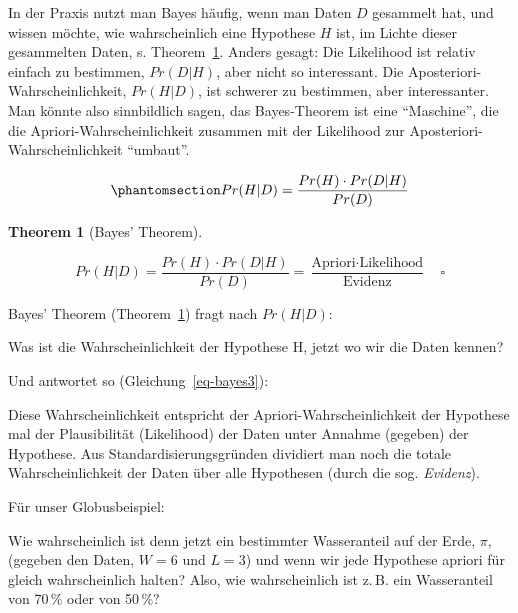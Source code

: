 \documentclass[
  ngerman,
  letterpaper,
  twoside,
  open=any]{scrbook}
\theoremstyle{definition}
\theoremstyle{plain}
\newtheorem{theorem}{Theorem}[chapter]
\theoremstyle{definition}
\theoremstyle{definition}
\theoremstyle{definition}
\theoremstyle{definition}
\theoremstyle{remark}
\begin{document}
In der Praxis nutzt man Bayes häufig, wenn man Daten \(D\) gesammelt
hat, und wissen möchte, wie wahrscheinlich eine Hypothese \(H\) ist, im
Lichte dieser gesammelten Daten, s. Theorem~\ref{thm-bayes1}. Anders
gesagt: Die Likelihood ist relativ einfach zu bestimmen, \(Pr(D|H)\),
aber nicht so interessant. Die Aposteriori-Wahrscheinlichkeit,
\(Pr(H|D)\), ist schwerer zu bestimmen, aber interessanter. Man könnte
also sinnbildlich sagen, das Bayes-Theorem ist eine \enquote{Maschine},
die die Apriori-Wahrscheinlichkeit zusammen mit der Likelihood zur
Aposteriori-Wahrscheinlichkeit \enquote{umbaut}.

\begin{equation}\protect\phantomsection\label{eq-bayes3}{Pr(H|D) = \frac{ Pr(H) \cdot Pr(D|H) }{Pr(D)}}\end{equation}

\begin{theorem}[Bayes'
Theorem]\protect\hypertarget{thm-bayes1}{}\label{thm-bayes1}

\[
Pr(H|D) = \frac{ Pr(H) \cdot Pr(D|H) }{Pr(D)} = \frac{\text{Apriori} \cdot \text{Likelihood}} {\text{Evidenz}}\quad \square\]

\end{theorem}

Bayes' Theorem (Theorem~\ref{thm-bayes1}) fragt nach \(Pr(H|D)\):

\begin{displayquote}
Was ist die Wahrscheinlichkeit der Hypothese H, jetzt wo wir die Daten
kennen?
\end{displayquote}

Und antwortet so (Gleichung~\ref{eq-bayes3}):

\begin{displayquote}
Diese Wahrscheinlichkeit entspricht der Apriori-Wahrscheinlichkeit der
Hypothese mal der Plausibilität (Likelihood) der Daten unter Annahme
(gegeben) der Hypothese. Aus Standardisierungsgründen dividiert man noch
die totale Wahrscheinlichkeit der Daten über alle Hypothesen (durch die
sog. \emph{Evidenz}).
\end{displayquote}

Für unser Globusbeispiel:

\begin{displayquote}
Wie wahrscheinlich ist denn jetzt ein bestimmter Wasseranteil auf der
Erde, \(\pi\), (gegeben den Daten, \(W=6\) und \(L=3\)) und wenn wir
jede Hypothese apriori für gleich wahrscheinlich halten? Also, wie
wahrscheinlich ist z.\,B. ein Wasseranteil von 70\,\% oder von 50\,\%?
\end{displayquote}
\end{document}
